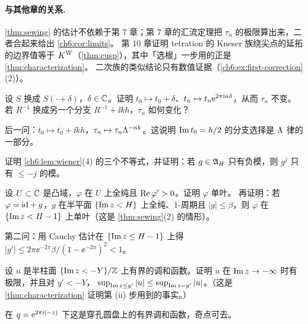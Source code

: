 \paragraph{与其他章的关系.}
\cref{thm:sewing} 的估计不依赖于第 7 章；第 7 章的汇流定理把 $\tau_n$ 的极限算出来，二者合起来给出 \cref{ch6:cor:limits}。
第 10 章证明 tetration 的 Kneser 族绕尖点的延拓的边界值等于 $K^{\mathrm W}$（\cref{thm:cusp}），其中「选根」一步用的正是 \cref{thm:characterization}。
二次族的类似结论只有数值证据（\cref{ch6:ex:first-correction}(2)）。

\exercises

\begin{exercise}\label{ch6:ex:taun}
设 $S$ 换成 $S(\cdot+\delta)$，$\delta\in\mathbb{C}$。证明 $t_0\mapsto t_0+\delta$、$t_n\mapsto t_n\mathrm{e}^{2\pi\mathrm{i} n\delta}$，从而 $\tau_n$ 不变。
若 $R^{-1}$ 换成另一个分支 $R^{-1}+\ii kh$，$\tau_n$ 如何变化？
\end{exercise}
\begin{hint}
后一问：$t_0\mapsto t_0+\ii kh$，$\tau_n\mapsto\tau_n\Lambda^{-nk}$。这说明 $\operatorname{Im} t_0=h/2$ 的分支选择是 $\Lambda$ 律的一部分。
\end{hint}

\begin{exercise}\label{ch6:ex:wiener}
证明 \cref{ch6:lem:wiener}(4) 的三个不等式，并证明：若 $g\in\mathfrak A_H$ 只有负模，则 $g^j$ 只有 $\le-j$ 的模。
\end{exercise}

\begin{exercise}\label{ch6:ex:noshiro}
设 $U\subset\mathbb{C}$ 是凸域，$\varphi$ 在 $U$ 上全纯且 $\operatorname{Re}\varphi'>0$。证明 $\varphi$ 单叶。
再证明：若 $\varphi=\mathrm{id}+g$，$g$ 在半平面 $\{\operatorname{Im} z<H\}$ 上全纯、$1$-周期且 $|g|\le\beta$，则 $\varphi$ 在 $\{\operatorname{Im} z<H-1\}$ 上单叶（这是 \cref{thm:sewing}(2) 的情形）。
\end{exercise}
\begin{hint}
第二问：用 Cauchy 估计在 $\{\operatorname{Im} z\le H-1\}$ 上得 $|g'|\le2\pi\ee^{-2\pi}\beta/(1-\ee^{-2\pi})^2<1$。
\end{hint}

\begin{exercise}\label{ch6:ex:harmonic}
设 $u$ 是半柱面 $\{\operatorname{Im} z<-Y\}/\mathbb{Z}$ 上有界的调和函数。证明 $u$ 在 $\operatorname{Im} z\to-\infty$ 时有极限，并且对 $y'<-Y$，
$\sup_{\operatorname{Im} z\le y'}|u|\le\sup_{\operatorname{Im} z=y'}|u|$。（这是 \cref{thm:characterization} 证明第 (ii) 步用到的事实。）
\end{exercise}
\begin{hint}
在 $q=\mathrm{e}^{2\pi\mathrm{i} (-z)}$ 下这是穿孔圆盘上的有界调和函数，奇点可去。
\end{hint}

